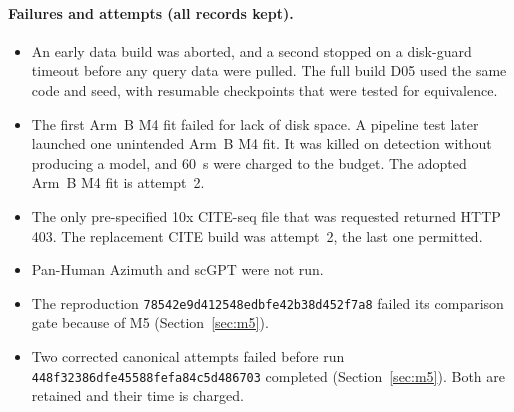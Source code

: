 \documentclass[11pt]{article}
\newcommand{\runid}{\nolinkurl{448f32386dfe45588fefa84c5d486703}}
\newcommand{\failrunid}{\nolinkurl{78542e9d412548edbfe42b38d452f7a8}}
\begin{document}
\paragraph{Failures and attempts (all records kept).}
\begin{itemize}
\item An early data build was aborted, and a second stopped on a disk-guard timeout before any query data were pulled. The full build D05 used the same code and seed, with resumable checkpoints that were tested for equivalence.
\item The first Arm~B M4 fit failed for lack of disk space. A pipeline test later launched one unintended Arm~B M4 fit. It was killed on detection without producing a model, and 60~s were charged to the budget. The adopted Arm~B M4 fit is attempt~2.
\item The only pre-specified 10x CITE-seq file that was requested returned HTTP 403. The replacement CITE build was attempt~2, the last one permitted.
\item Pan-Human Azimuth and scGPT were not run.
\item The reproduction \failrunid{} failed its comparison gate because of M5 (Section~\ref{sec:m5}).
\item Two corrected canonical attempts failed before run \runid{} completed (Section~\ref{sec:m5}). Both are retained and their time is charged.
\end{itemize}
\end{document}
